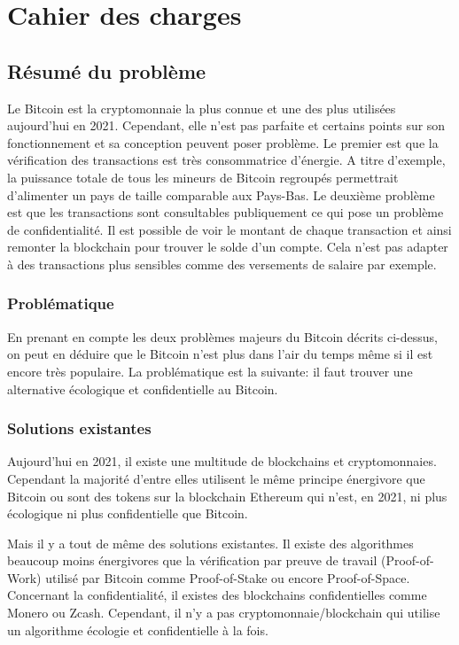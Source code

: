 \chapter{Cahier des charges}



\section*{Résumé du problème}

Le Bitcoin est la cryptomonnaie la plus connue et une des plus utilisées aujourd'hui en 2021. Cependant, elle n'est pas parfaite et certains points sur son fonctionnement et sa conception peuvent poser problème. Le premier est que la vérification des transactions est très consommatrice d'énergie. A titre d'exemple, la puissance totale de tous les mineurs de Bitcoin regroupés permettrait d'alimenter un pays de taille comparable aux Pays-Bas\cite{BTC_cons}. Le deuxième problème est que les transactions sont consultables publiquement ce qui pose un problème de confidentialité. Il est possible de voir le montant de chaque transaction et ainsi remonter la blockchain pour trouver le solde d'un compte. Cela n'est pas adapter à des transactions plus sensibles comme des versements de salaire par exemple.

\subsection*{Problématique}

En prenant en compte les deux problèmes majeurs du Bitcoin décrits ci-dessus, on peut en déduire que le Bitcoin n'est plus dans l'air du temps même si il est encore très populaire. La problématique est la suivante: il faut trouver une alternative écologique et confidentielle au Bitcoin.

\subsection*{Solutions existantes}

Aujourd'hui en 2021, il existe une multitude de blockchains et cryptomonnaies. Cependant la majorité d'entre elles utilisent le même principe énergivore que Bitcoin ou sont des tokens sur la blockchain Ethereum qui n'est, en 2021, ni plus écologique ni plus confidentielle que Bitcoin.

Mais il y a tout de même des solutions existantes. Il existe des algorithmes beaucoup moins énergivores que la vérification par preuve de travail (Proof-of-Work) utilisé par Bitcoin comme Proof-of-Stake ou encore Proof-of-Space. Concernant la confidentialité, il existes des blockchains confidentielles comme Monero ou Zcash. Cependant, il n'y a pas cryptomonnaie/blockchain qui utilise un algorithme écologie et confidentielle à la fois.

